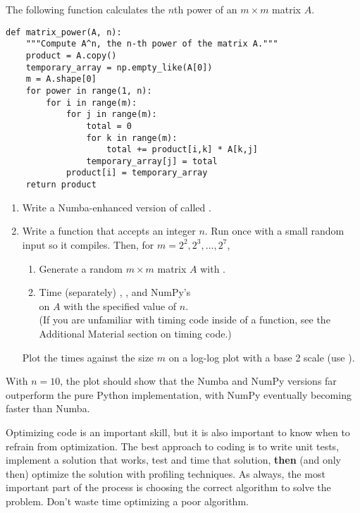 \begin{problem} %
The following function calculates the $n$th power of an $m\times m$ matrix $A$.

\begin{lstlisting}
def matrix_power(A, n):
    """Compute A^n, the n-th power of the matrix A."""
    product = A.copy()
    temporary_array = np.empty_like(A[0])
    m = A.shape[0]
    for power in range(1, n):
        for i in range(m):
            for j in range(m):
                total = 0
                for k in range(m):
                    total += product[i,k] * A[k,j]
                temporary_array[j] = total
            product[i] = temporary_array
    return product
\end{lstlisting}

\begin{enumerate}
\item Write a Numba-enhanced version of  called .
\item Write a function that accepts an integer $n$.
Run  once with a small random input so it compiles.
Then, for $m=2^2,2^3,\ldots,2^7$,
    \begin{enumerate}
        \item Generate a random $m\times m$ matrix $A$ with .
        \item Time (separately) , , and NumPy's \\  on $A$ with the specified value of $n$.
        \\(If you are unfamiliar with timing code inside of a function, see the \\ Additional Material section on timing code.)
    \end{enumerate}
Plot the times against the size $m$ on a log-log plot with a base 2 scale (use ).
\end{enumerate}
With $n=10$, the plot should show that the Numba and NumPy versions far outperform the pure Python implementation, with NumPy eventually becoming faster than Numba.
\end{problem}

\begin{warn}
Optimizing code is an important skill, but it is also important to know when to refrain from optimization.
The best approach to coding is to write unit tests, implement a solution that works, test and time that solution, \textbf{then} (and only then) optimize the solution with profiling techniques.
As always, the most important part of the process is choosing the correct algorithm to solve the problem.
Don't waste time optimizing a poor algorithm.
\end{warn}

